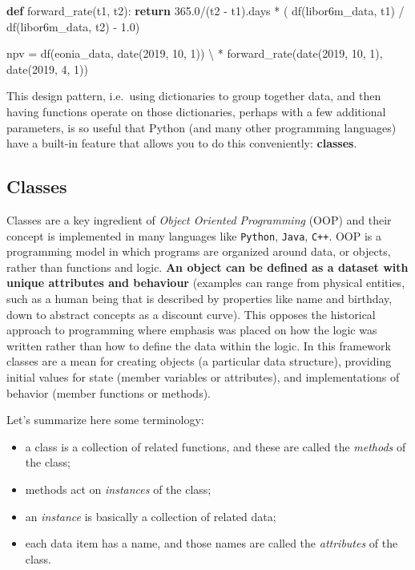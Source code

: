 \documentclass[11pt]{article}
\providecommand{\tightlist}{%
      \setlength{\itemsep}{0pt}\setlength{\parskip}{0pt}}
\newenvironment{Shaded}{}{}
\newcommand{\KeywordTok}[1]{\textcolor[rgb]{0.00,0.44,0.13}{\textbf{{#1}}}}
\newcommand{\DecValTok}[1]{\textcolor[rgb]{0.25,0.63,0.44}{{#1}}}
\newcommand{\FloatTok}[1]{\textcolor[rgb]{0.25,0.63,0.44}{{#1}}}
\newcommand{\NormalTok}[1]{{#1}}
\newcommand{\ControlFlowTok}[1]{\textcolor[rgb]{0.00,0.44,0.13}{\textbf{{#1}}}}
\newcommand{\OperatorTok}[1]{\textcolor[rgb]{0.40,0.40,0.40}{{#1}}}
\begin{document}
\begin{Shaded}
\begin{Highlighting}[]
\KeywordTok{def}\NormalTok{ forward_rate(t1, t2):}
    \ControlFlowTok{return} \FloatTok{365.0}\OperatorTok{/}\NormalTok{(t2 - t1).days }\OperatorTok{*}\NormalTok{ (}
\NormalTok{        df(libor6m_data, t1) }\OperatorTok{/}
\NormalTok{        df(libor6m_data, t2) - }\FloatTok{1.0}\NormalTok{)}
        
\NormalTok{npv }\OperatorTok{=}\NormalTok{ df(eonia_data, date(}\DecValTok{2019}\NormalTok{, }\DecValTok{10}\NormalTok{, }\DecValTok{1}\NormalTok{)) }\OperatorTok{\textbackslash{}}
    \OperatorTok{*}\NormalTok{ forward_rate(date(}\DecValTok{2019}\NormalTok{, }\DecValTok{10}\NormalTok{, }\DecValTok{1}\NormalTok{), date(}\DecValTok{2019}\NormalTok{, }\DecValTok{4}\NormalTok{, }\DecValTok{1}\NormalTok{))}
\end{Highlighting}
\end{Shaded}

    This design pattern, i.e.~using dictionaries to group together data, and
then having functions operate on those dictionaries, perhaps with a few
additional parameters, is so useful that Python (and many other
programming languages) have a built-in feature that allows you to do
this conveniently: \textbf{classes}.

    \hypertarget{classes}{%
\subsection{Classes}\label{classes}}

Classes are a key ingredient of \emph{Object Oriented Programming} (OOP)
and their concept is implemented in many languages like \texttt{Python},
\texttt{Java}, \texttt{C++}. OOP is a programming model in which
programs are organized around data, or objects, rather than functions
and logic. \textbf{An object can be defined as a dataset with unique
attributes and behaviour} (examples can range from physical entities,
such as a human being that is described by properties like name and
birthday, down to abstract concepts as a discount curve). This opposes
the historical approach to programming where emphasis was placed on how
the logic was written rather than how to define the data within the
logic. In this framework classes are a mean for creating objects (a
particular data structure), providing initial values for state (member
variables or attributes), and implementations of behavior (member
functions or methods).

Let's summarize here some terminology:

\begin{itemize}
\tightlist
\item
  a class is a collection of related functions, and these are called the
  \emph{methods} of the class;
\item
  methods act on \emph{instances} of the class;
\item
  an \emph{instance} is basically a collection of related data;
\item
  each data item has a name, and those names are called the
  \emph{attributes} of the class.
\end{itemize}
\end{document}
